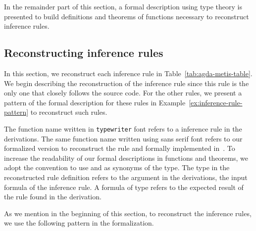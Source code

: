 \documentclass[../main.tex]{subfiles}
\begin{document}
In the remainder part of this section, a formal description using
type theory is presented to build definitions and theorems of
functions necessary to reconstruct \Metis inference rules.


\subsection{Reconstructing \Metis inference rules}
\label{ssec:emulating-inferences}

In this section, we reconstruct each \Metis inference rule in
Table~\ref{tab:agda-metis-table}.
We begin describing the reconstruction of the \strip inference rule
since this rule  is the only one that closely follows the \Metis
source code. For the other rules, we present a pattern of the formal
description for these rules in
Example~\ref{ex:inference-rule-pattern} to reconstruct such rules.

\begin{notation}
  The function name written in \texttt{typewriter} font refers to a
  \Metis inference rule in the \TSTP derivations. The same function
  name written using
  \textsf{sans serif} font refers to our formalized version to
  reconstruct the rule and formally implemented in~\cite{AgdaMetis}.
  To increase the readability of our formal descriptions in
  functions and theorems, we adopt
  the convention to use \Source and \Target as synonyms of the \Prop
  type. The \Source type in the reconstructed rule definition refers
  to the argument in the \TSTP derivations, \ie the input formula of
  the inference rule. A formula of \Target type refers to the
  expected result of the rule found in the \TSTP derivation.
\end{notation}



As we mention in the beginning of this section, to reconstruct
the \Metis inference rules, we use the following pattern in
the formalization.
\end{document}
